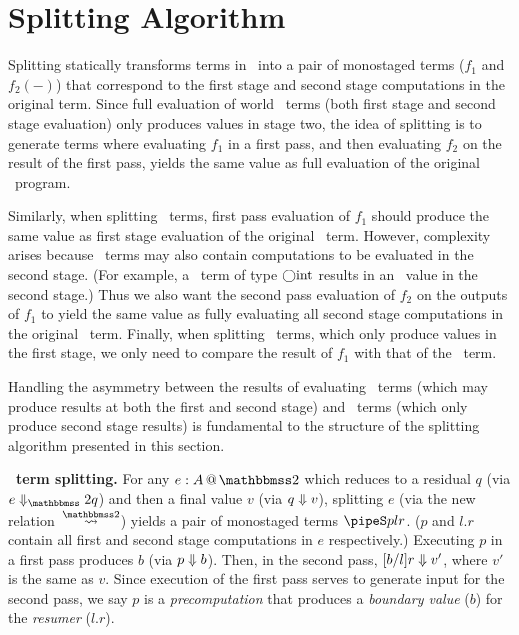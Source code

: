 
\section{Splitting Algorithm}
\label{sec:splitting}

%

\begin{abstrsyn}

Splitting statically transforms terms in \lang\ into a pair of
monostaged terms ($f_1$ and $f_2(-)$) that correspond to the first
stage and second stage computations in the original term. Since full
evaluation of world \bbtwo\ terms (both first stage and second stage
evaluation) only produces values in stage two, the idea of splitting
is to generate terms where evaluating $f_1$ in a first pass, and then
evaluating $f_2$ on the result of the first pass, yields the same
value as full evaluation of the original \lang\ program.

Similarly, when splitting \bbonem\ terms, first pass evaluation of
$f_1$ should produce the same value as first stage evaluation of the
original \lang\ term.  However, complexity arises because
\bbonem\ terms may also contain computations to be evaluated in the
second stage. (For example, a \bbonem\ term of type $\bigcirc {\rm int}$
results in an \rmint\ value in the second stage.) Thus we also want
the second pass evaluation of $f_2$ on the outputs of $f_1$ to yield
the same value as fully evaluating all second stage computations in
the original \bbonem\ term. Finally, when splitting \bbonep\ terms,
which only produce values in the first stage, we only need to compare
the result of $f_1$ with that of the \lang\ term.

Handling the asymmetry between the results of evaluating
\bbonem\ terms (which may produce results at both the first and second
stage) and \bbtwo\ terms (which only produce second stage results) is
fundamental to the structure of the splitting algorithm presented in
this section.

\textbf{\bbtwo\ term splitting.}  For any $\coltwo e A$ which reduces
to a residual $q$ (via $\diatwo e q$) and then a final value $v$ (via
${q} \Downarrow {v}$), splitting $e$ (via the new relation~$\splittwosym$)
yields a pair of monostaged terms $\pipeS p l r$. ($p$ and $l.r$
contain all first and second stage computations in $e$ respectively.)
Executing $p$ in a first pass produces $b$ (via ${p} \Downarrow {b}$). Then,
in the second pass, ${[b/l]r} \Downarrow {v'}$, where $v'$ is the same as
$v$.  Since execution of the first pass serves to generate input for
the second pass, we say $p$ is a {\em precomputation} that produces a
{\em boundary value} ($b$) for the {\em resumer} ($l.r$).


\end{abstrsyn}
